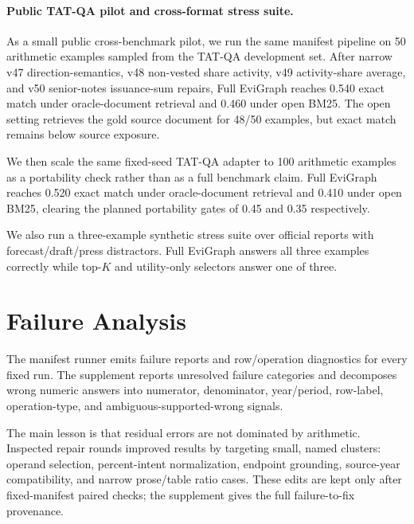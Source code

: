 \documentclass[letterpaper]{article}
\begin{document}
\paragraph{Public TAT-QA pilot and cross-format stress suite.}
As a small public cross-benchmark pilot, we run the same manifest pipeline on 50 arithmetic examples sampled from the TAT-QA development set.
After narrow v47 direction-semantics, v48 non-vested share activity, v49 activity-share average, and v50 senior-notes issuance-sum repairs, Full EviGraph reaches 0.540 exact match under oracle-document retrieval and 0.460 under open BM25.
The open setting retrieves the gold source document for 48/50 examples, but exact match remains below source exposure.



We then scale the same fixed-seed TAT-QA adapter to 100 arithmetic examples as a portability check rather than as a full benchmark claim.
Full EviGraph reaches 0.520 exact match under oracle-document retrieval and 0.410 under open BM25, clearing the planned portability gates of 0.45 and 0.35 respectively.



We also run a three-example synthetic stress suite over official reports with forecast/draft/press distractors.
Full EviGraph answers all three examples correctly while top-\(K\) and utility-only selectors answer one of three.



\section{Failure Analysis}

The manifest runner emits failure reports and row/operation diagnostics for every fixed run.
The supplement reports unresolved failure categories and decomposes wrong numeric answers into numerator, denominator, year/period, row-label, operation-type, and ambiguous-supported-wrong signals.

The main lesson is that residual errors are not dominated by arithmetic.
Inspected repair rounds improved results by targeting small, named clusters: operand selection, percent-intent normalization, endpoint grounding, source-year compatibility, and narrow prose/table ratio cases.
These edits are kept only after fixed-manifest paired checks; the supplement gives the full failure-to-fix provenance.
\end{document}
